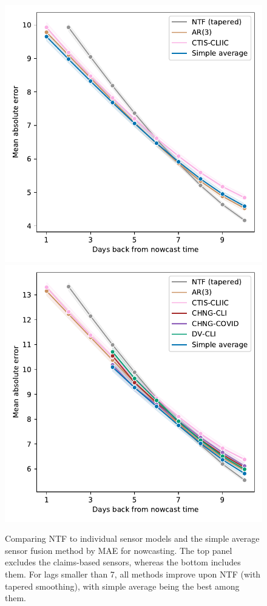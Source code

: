\documentclass[sts]{imsart}
\theoremstyle{plain}
\theoremstyle{definition}
\theoremstyle{remark}
\begin{document}
\begin{figure}[tb]
\centering 
\includegraphics[width=0.85\linewidth]{./figures/lineplot_no_claims_no_google_aa.pdf} 
\includegraphics[width=0.85\linewidth]{./figures/lineplot_claims_no_google_aa.pdf}
\caption{Comparing NTF to individual sensor models and the simple average sensor
  fusion method by MAE for nowcasting. The top panel excludes the claims-based
  sensors, whereas the bottom includes them. For lags smaller than 7, all
  methods improve upon NTF (with tapered smoothing), with simple average being 
  the best among them.}    
\label{fig:mae_all_no_google_aa}
\end{figure}
\end{document}
